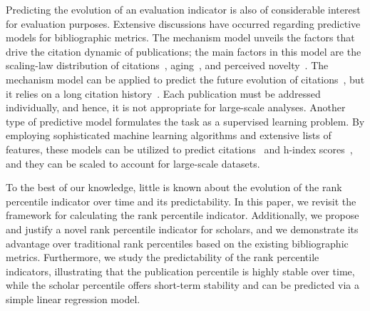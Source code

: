Predicting the evolution of an evaluation indicator is also of considerable interest for evaluation purposes. Extensive discussions have occurred regarding predictive models for bibliographic metrics. The mechanism model unveils the factors that drive the citation dynamic of publications; the main factors in this model are the scaling-law distribution of citations~\cite{price1976general,barabasi1999emergence,peterson2010nonuniversal,Radicchi2008}, aging~\cite{barabasi1999emergence,albert2002statistical,hajra2006modelling,dorogovtsev2000evolution}, and perceived novelty~\cite{Wang2013}. The mechanism model can be applied to predict the future evolution of citations~\cite{Wang2013}, but it relies on a long citation history~\cite{wang2014science,wang2014response}. Each publication must be addressed individually, and hence, it is not appropriate for large-scale analyses. Another type of predictive model formulates the task as a supervised learning problem. By employing sophisticated machine learning algorithms and extensive lists of features, these models can be utilized to predict citations~\cite{fu2008models,lokker2008prediction,ibanez2009predicting,mazloumian2012predicting,stern2014high,weihs2017learning} and h-index scores~\cite{hirsch2007does,acuna2012future,penner2013predictability,weihs2017learning,weis2021learning}, and they can be scaled to account for large-scale datasets. 

To the best of our knowledge, little is known about the evolution of the rank percentile indicator over time and its predictability. In this paper, we revisit the framework for calculating the rank percentile indicator. Additionally, we propose and justify a novel rank percentile indicator for scholars, and we demonstrate its advantage over traditional rank percentiles based on the existing bibliographic metrics. Furthermore, we study the predictability of the rank percentile indicators, illustrating that the publication percentile is highly stable over time, while the scholar percentile offers short-term stability and can be predicted via a simple linear regression model.

